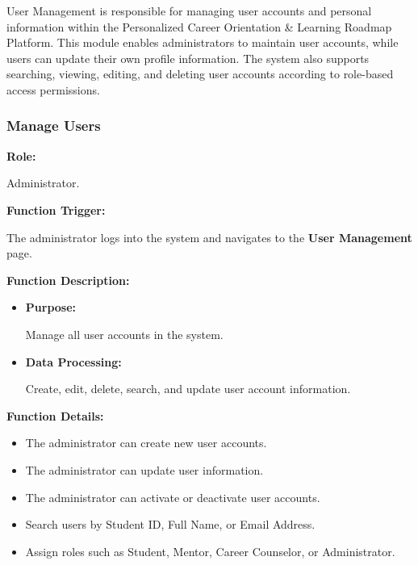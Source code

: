 User Management is responsible for managing user accounts and personal information within the Personalized Career Orientation \& Learning Roadmap Platform. This module enables administrators to maintain user accounts, while users can update their own profile information. The system also supports searching, viewing, editing, and deleting user accounts according to role-based access permissions.
\subsubsection{Manage Users}

\textbf{Role:}

Administrator.

\vspace{0.3cm}

\textbf{Function Trigger:}

The administrator logs into the system and navigates to the \textbf{User Management} page.

\vspace{0.3cm}

\textbf{Function Description:}

\begin{itemize}
    \item \textbf{Purpose:}

    Manage all user accounts in the system.

    \item \textbf{Data Processing:}

    Create, edit, delete, search, and update user account information.
\end{itemize}

\vspace{0.3cm}

\textbf{Function Details:}

\begin{itemize}
    \item The administrator can create new user accounts.

    \item The administrator can update user information.

    \item The administrator can activate or deactivate user accounts.

    \item Search users by Student ID, Full Name, or Email Address.

    \item Assign roles such as Student, Mentor, Career Counselor, or Administrator.
\end{itemize}

